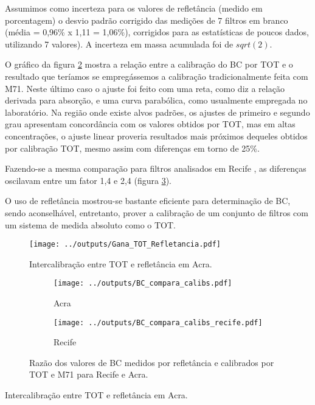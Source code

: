 Assumimos como incerteza para os valores de refletância (medido em porcentagem)
o desvio padrão corrigido das medições de 7 filtros em branco 
(média = 0,96\% x 1,11 = 1,06\%), corrigidos para as estatísticas de poucos 
dados, utilizando 7 valores). A incerteza em massa acumulada foi de $sqrt(2)$.

O gráfico da figura \ref{fig:razaoTOTM71} mostra a relação entre a calibração do 
BC por TOT e o resultado que teríamos se empregássemos a calibração 
tradicionalmente feita com M71. Neste último caso o ajuste foi feito com uma
reta, como diz a relação derivada para absorção, e uma curva parabólica, 
como usualmente empregada no laboratório. Na região onde existe alvos padrões, 
os ajustes de primeiro e segundo grau apresentam concordância com os valores 
obtidos por TOT, mas em altas concentrações, o ajuste linear proveria resultados
mais próximos dequeles obtidos por calibração TOT, mesmo assim com diferenças 
em torno de 25\%. 

Fazendo-se a mesma comparação para filtros analisados em Recife \citep{santos2014},
as diferenças oscilavam entre um fator 1,4 e 2,4 (figura \ref{fig:BC_compara_recife}).

O uso de refletância mostrou-se bastante eficiente para determinação de BC, 
sendo aconselhável, entretanto, prover a calibração de um conjunto de filtros 
com um sistema de medida absoluto como o TOT.


\begin{figure}[H]
	\begin{center}
		\texttt{[image: ../outputs/Gana\_TOT\_Refletancia.pdf]}
		\caption{Intercalibração entre TOT e refletância em Acra. \label{fig:interGanaBC}}
	\end{center}
\end{figure}

\begin{figure}[H]
	\centering
	\begin{subfigure}[b]{0.43\linewidth}
		\texttt{[image: ../outputs/BC\_compara\_calibs.pdf]}
		\caption{Acra \label{fig:razaoTOTM71}}
	\end{subfigure}
		\hspace{0.3cm}
	\begin{subfigure}[b]{0.43\linewidth}
		\texttt{[image: ../outputs/BC\_compara\_calibs\_recife.pdf]}
		\caption{Recife \label{fig:BC_compara_recife}}
	\end{subfigure}%

	\caption{Razão dos valores de BC medidos por refletância e calibrados por 
		TOT e M71 para Recife e Acra. \label{fig:BC_compara}}
\end{figure}

\begin{table}[H]
	\centering
	\small
	
	\caption{Intercalibração entre TOT e refletância em Acra. \label{table:interGanaBC}} 
\end{table} 


